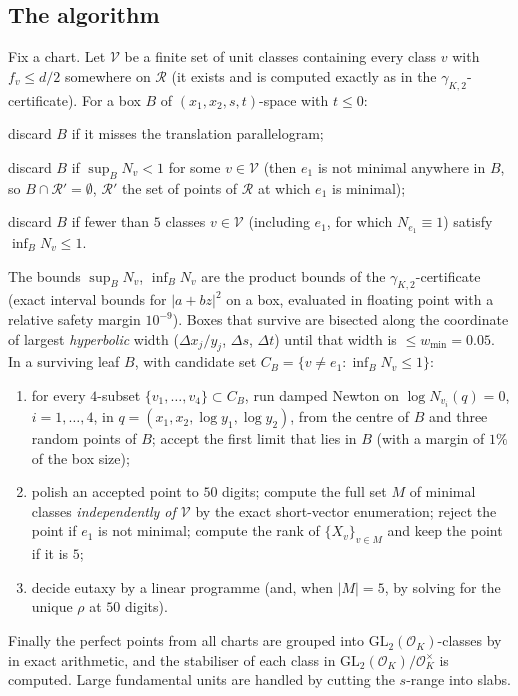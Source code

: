 \documentclass[11pt]{amsart}
\theoremstyle{definition}
\theoremstyle{remark}
\newcommand{\OK}{\mathcal{O}_K}
\newcommand{\GL}{\mathrm{GL}}
\newcommand{\gK}{\gamma_{K,2}}
\begin{document}
\subsection{The algorithm}\label{subsec:algo}
Fix a chart.  Let $\mathcal V$ be a finite set of unit classes containing every class $v$ with
$f_v\le d/2$ somewhere on $\mathcal R$ (it exists and is computed exactly as in the
$\gK$-certificate).  For a box $B$ of $(x_1,x_2,s,t)$-space with $t\le0$:
\begin{description}[leftmargin=*]
\item[Rule 3] discard $B$ if it misses the translation parallelogram;
\item[Rule 1] discard $B$ if $\sup_BN_v<1$ for some $v\in\mathcal V$ (then $e_1$ is not
minimal anywhere in $B$, so $B\cap\mathcal R'=\emptyset$, $\mathcal R'$ the set of points of
$\mathcal R$ at which $e_1$ is minimal);
\item[Rule 5] discard $B$ if fewer than $5$ classes $v\in\mathcal V$ (including $e_1$, for which
$N_{e_1}\equiv1$) satisfy $\inf_BN_v\le1$.
\end{description}
The bounds $\sup_BN_v$, $\inf_BN_v$ are the product bounds of the $\gK$-certificate (exact
interval bounds for $|a+bz|^2$ on a box, evaluated in floating point with a relative safety
margin $10^{-9}$).  Boxes that survive are bisected along the coordinate of largest
\emph{hyperbolic} width ($\Delta x_j/y_j$, $\Delta s$, $\Delta t$) until that width is
$\le w_{\min}=0.05$.  In a surviving leaf $B$, with candidate set
$C_B=\{v\ne e_1:\inf_BN_v\le1\}$:
\begin{enumerate}[leftmargin=*]
\item for every $4$-subset $\{v_1,\dots,v_4\}\subset C_B$, run damped Newton on
$\log N_{v_i}(q)=0$, $i=1,\dots,4$, in $q=(x_1,x_2,\log y_1,\log y_2)$, from the centre of
$B$ and three random points of $B$; accept the first limit that lies in $B$ (with a margin
of $1\%$ of the box size);
\item polish an accepted point to $50$ digits; compute the full set $M$ of minimal classes
\emph{independently of $\mathcal V$} by the exact short-vector enumeration; reject the point
if $e_1$ is not minimal; compute the rank of $\{X_v\}_{v\in M}$ and keep the point if it is
$5$;
\item decide eutaxy by a linear programme (and, when $|M|=5$, by solving for the unique
$\rho$ at $50$ digits).
\end{enumerate}
Finally the perfect points from all charts are grouped into $\GL_2(\OK)$-classes by
\cite[Alg.~11]{PW05} in exact arithmetic, and the stabiliser of each class in
$\GL_2(\OK)/\OK^\times$ is computed.  Large fundamental units are handled by cutting the
$s$-range into slabs.
\end{document}
